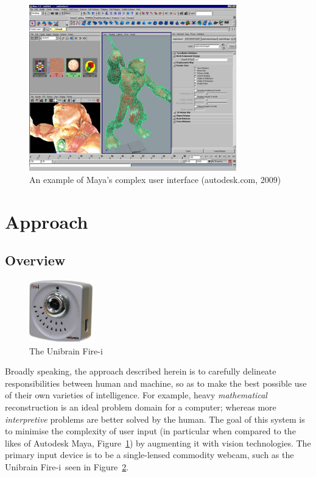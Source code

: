 \documentclass[a4paper,10pt]{article}
\begin{document}
\begin{figure}
  \begin{center}
    \includegraphics[width=340px]{maya}
  \end{center}
  \caption[An example of Maya's complex user interface]{An example of Maya's complex user interface (autodesk.com, 2009)}
  \label{maya}
\end{figure}

\clearpage

\section{Approach}
\subsection{Overview}

\begin{figure}
  \vspace{-20pt}
  \begin{center}
    \includegraphics[width=80pt]{firei}
  \end{center}
  \caption{The Unibrain Fire-i\texttrademark}
  \label{firei}
\end{figure}

Broadly speaking, the approach described herein is to carefully delineate responsibilities between human and machine, so as to make the best possible use of their own varieties of intelligence. For example, heavy \textit{mathematical} reconstruction is an ideal problem domain for a computer; whereas more \textit{interpretive} problems are better solved by the human. The goal of this system is to minimise the complexity of user input (in particular when compared to the likes of Autodesk Maya, Figure~\ref{maya}) by augmenting it with vision technologies. The primary input device is to be a single-lensed commodity webcam, such as the Unibrain Fire-i\texttrademark ~seen in Figure~\ref{firei}.
\end{document}
